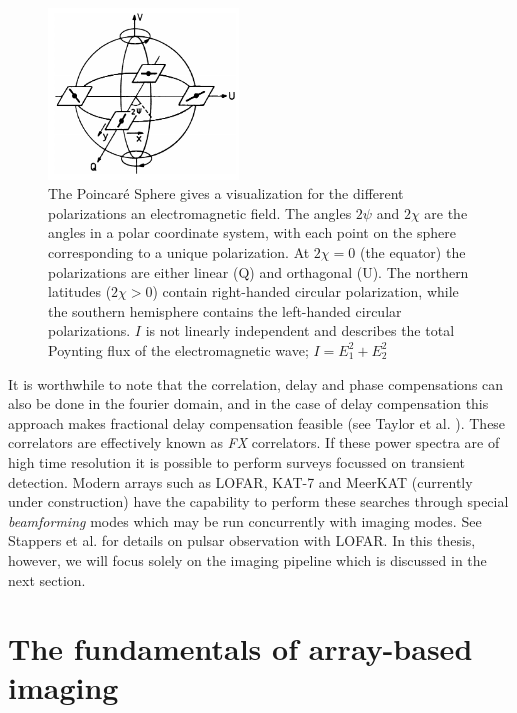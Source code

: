 \documentclass[a4paper,10pt]{report}
\begin{document}
\begin{figure}
 \begin{mdframed}
 \centering
 \includegraphics[width=0.45\textwidth]{images/poincare_sphere.png}
 \caption[The Poincar\'e Sphere]{The Poincar\'e Sphere gives a visualization for the different polarizations an electromagnetic field. The angles $2\psi$ and
 $2\chi$ are the angles in a polar coordinate system, with each point on the sphere corresponding to a unique polarization. At $2\chi=0$ (the equator) the polarizations 
 are either linear (Q) and orthagonal (U). The northern latitudes ($2\chi > 0$) contain right-handed circular polarization, while the southern hemisphere 
 contains the left-handed circular polarizations. $I$ is not linearly independent and describes the total Poynting flux of the electromagnetic wave; $I = E_1^2 + E_2^2$ \cite{wilson2009tools}}
  \label{fig_poincare}
 \end{mdframed}
\end{figure}

It is worthwhile to note that the correlation, delay and phase compensations can also be done in the fourier domain, and in the case of delay compensation this approach makes fractional delay compensation feasible (see Taylor et al. \cite{taylor1999synthesis}). These correlators are effectively 
known as \textit{FX} correlators. If these power spectra are of high time resolution it is possible to perform surveys focussed on transient detection. Modern arrays such as LOFAR, KAT-7 and MeerKAT (currently under construction) have the capability to perform these searches through
special \textit{beamforming} modes which may be run concurrently with imaging modes. See Stappers et al. \cite{stappers2011observing} for details on pulsar observation with LOFAR. In this thesis, however, we will focus solely on the imaging pipeline which is discussed in the next section.

\section{The fundamentals of array-based imaging}
\end{document}
